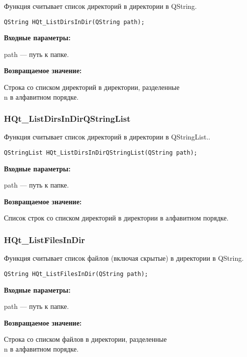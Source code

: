\documentclass[a4paper,12pt]{article}
\begin{document}
Функция считывает список директорий в директории в QString.


\begin{lstlisting}[label=code_syntax_HQt_ListDirsInDir,caption=Синтаксис]
QString HQt_ListDirsInDir(QString path);
\end{lstlisting}

\textbf{Входные параметры:}

path --- путь к папке.

\textbf{Возвращаемое значение:}

 Строка со списком директорий в директории, разделенные \\n в алфавитном порядке.


\subsubsection{HQt\_ListDirsInDirQStringList}\label{HQt_ListDirsInDirQStringList}

Функция считывает список директорий в директории в QStringList..


\begin{lstlisting}[label=code_syntax_HQt_ListDirsInDirQStringList,caption=Синтаксис]
QStringList HQt_ListDirsInDirQStringList(QString path);
\end{lstlisting}

\textbf{Входные параметры:}

path --- путь к папке.

\textbf{Возвращаемое значение:}

Список строк со списком директорий в директории в алфавитном порядке.


\subsubsection{HQt\_ListFilesInDir}\label{HQt_ListFilesInDir}

Функция считывает список файлов (включая скрытые) в директории в QString.


\begin{lstlisting}[label=code_syntax_HQt_ListFilesInDir,caption=Синтаксис]
QString HQt_ListFilesInDir(QString path);
\end{lstlisting}

\textbf{Входные параметры:}

path --- путь к папке.

\textbf{Возвращаемое значение:}

Строка со списком файлов в директории, разделенные \\n в алфавитном порядке.
\end{document}
